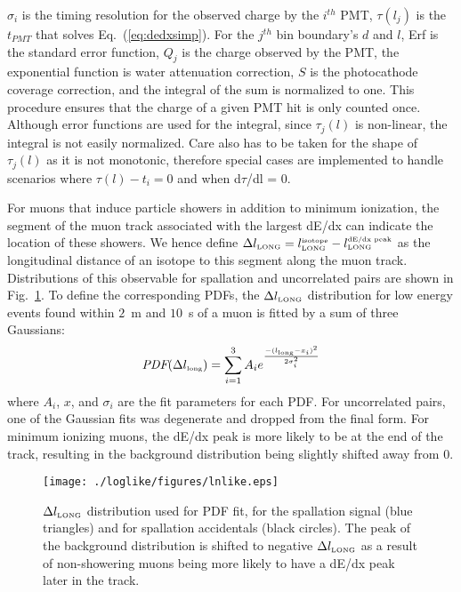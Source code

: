 $\sigma_i$ is the timing resolution for the observed charge by the $i^{th}$ PMT, $\tau(l_j)$ is the $t_{PMT}$ that solves Eq.~(\ref{eq:dedxsimp}). For the $j^{th}$ bin boundary's $d$ and $l$, Erf is the standard error function, $Q_j$ is the charge observed by the PMT, the exponential function is water attenuation correction, $S$ is the photocathode coverage correction, and the integral of the sum is normalized to one. This procedure ensures that the charge of a given PMT hit is only counted once. 
Although error functions are used for the integral, since $\tau_j(l)$ is non-linear, the integral is not easily normalized. Care also has to be taken for the shape of $\tau_j(l)$ as it is not monotonic, therefore special cases are implemented to handle scenarios where $\tau(l) - t_i = 0$ and when d$\tau$/dl = 0.

For muons that induce particle showers in addition to minimum ionization, the segment of the muon track associated with the largest dE/dx can indicate the location of these showers. We hence define $\Delta l_{\mbox{\tiny LONG}}=l_{\mbox{\tiny LONG}}^{\mbox{\tiny isotope}}-l_{\mbox{\tiny LONG}}^{\mbox{\tiny dE/dx peak}}$ as the longitudinal distance of an isotope to this segment along the muon track. Distributions of this observable for spallation and uncorrelated pairs are shown in Fig.~\ref{fig:ln}. To define the corresponding PDFs, the $\Delta l_{\mbox{\tiny LONG}}$ distribution for low energy events found within $2$~m and $10$~s of a muon is fitted by a sum of three Gaussians:
\begin{equation}
\mbox{\it PDF}(\Delta l_{\mbox{\tiny long}}) = \sum^3_{i=1} A_ie^{\frac{-(l_{\mbox{\tiny long}} - x_i)^2}{2\sigma_i^2}}
\end{equation}
where $A_i$, $x$, and $\sigma_i$ are the fit parameters for each PDF. For uncorrelated pairs, one of the Gaussian fits was degenerate and dropped from the final form. For minimum ionizing muons, the dE/dx peak is more likely to be at the end of the track, resulting in the background distribution being slightly shifted away from 0.

\begin{figure}
    \centering
    \texttt{[image: ./loglike/figures/lnlike.eps]}
    \caption{$\Delta l_{\mbox{\tiny LONG}}$ distribution used for PDF fit, for the spallation signal (blue triangles) and for spallation accidentals (black circles). The peak of the background distribution is shifted to negative $\Delta l_{\mbox{\tiny LONG}}$ as a result of non-showering muons being more likely to have a dE/dx peak later in the track.}
    \label{fig:ln}
\end{figure}

